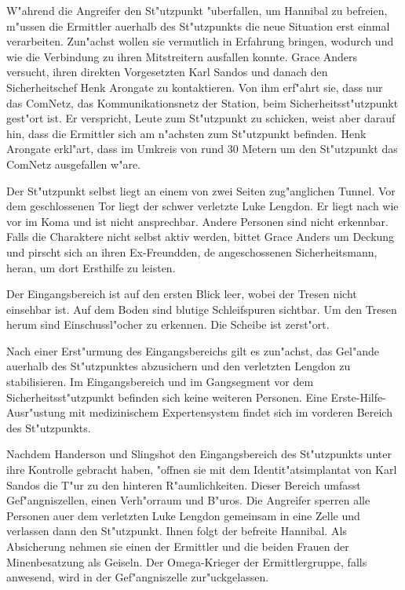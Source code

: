 
W"ahrend die Angreifer den St"utzpunkt "uberfallen, um Hannibal zu befreien, m"ussen die Ermittler au\3erhalb des St"utzpunkts die neue Situation erst einmal verarbeiten. Zun"achst wollen sie vermutlich in Erfahrung bringen, wodurch und wie die Verbindung zu ihren Mitstreitern ausfallen konnte. Grace Anders versucht, ihren direkten Vorgesetzten Karl Sandos und danach den Sicherheitschef Henk Arongate zu kontaktieren. Von ihm erf"ahrt sie, dass nur das ComNetz, das Kommunikationsnetz der Station, beim Sicherheitsst"utzpunkt gest"ort ist. Er verspricht, Leute zum St"utzpunkt zu schicken, weist aber darauf hin, dass die Ermittler sich am n"achsten zum St"utzpunkt befinden. Henk Arongate erkl"art, dass im Umkreis von rund 30 Metern um den St"utzpunkt das ComNetz ausgefallen w"are.

Der St"utzpunkt selbst liegt an einem von zwei Seiten zug"anglichen Tunnel. Vor dem geschlossenen Tor liegt der schwer verletzte Luke Lengdon. Er liegt nach wie vor im Koma und ist nicht ansprechbar. Andere Personen sind nicht erkennbar. Falls die Charaktere nicht selbst aktiv werden, bittet Grace Anders um Deckung und pirscht sich an ihren Ex-Freundden, de angeschossenen Sicherheitsmann, heran, um dort Ersthilfe zu leisten.

Der Eingangsbereich ist auf den ersten Blick leer, wobei der Tresen nicht einsehbar ist. Auf dem Boden sind blutige Schleifspuren sichtbar. Um den Tresen herum sind Einschussl"ocher zu erkennen. Die Scheibe ist zerst"ort. 

Nach einer Erst"urmung des Eingangsbereichs gilt es zun"achst, das Gel"ande au\3erhalb des St"utzpunktes abzusichern und den verletzten Lengdon zu stabilisieren. Im Eingangsbereich und im Gangsegment vor dem Sicherheitsst"utzpunkt befinden sich keine weiteren Personen. Eine Erste-Hilfe-Ausr"ustung mit medizinischem Expertensystem findet sich im vorderen Bereich des St"utzpunkts.


Nachdem Handerson und Slingshot den Eingangsbereich des St"utzpunkts unter ihre Kontrolle gebracht haben, "offnen sie mit dem Identit"atsimplantat von Karl Sandos die T"ur zu den hinteren R"aumlichkeiten. Dieser Bereich umfasst Gef"angniszellen, einen Verh"orraum und B"uros. Die Angreifer sperren alle Personen au\3er dem verletzten Luke Lengdon gemeinsam in eine Zelle und verlassen dann den St"utzpunkt. Ihnen folgt der befreite Hannibal. Als Absicherung nehmen sie einen der Ermittler und die beiden Frauen der Minenbesatzung als Geiseln. Der Omega-Krieger der Ermittlergruppe, falls anwesend, wird in der Gef"angniszelle zur"uckgelassen. 

